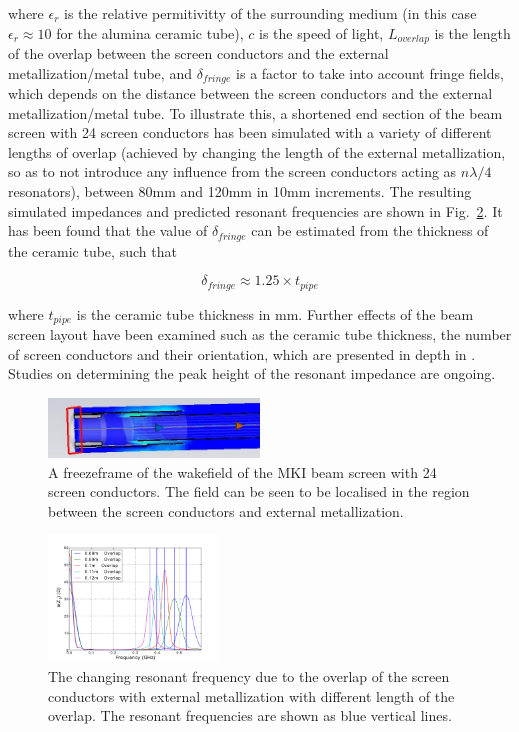 \documentclass{JAC2003}
\begin{document}
where $\epsilon_{r}$ is the relative permitivitty of the surrounding medium (in this case $\epsilon_{r} \approx 10$ for the alumina ceramic tube), $c$ is the speed of light, $L_{overlap}$ is the length of the overlap between the screen conductors and the external metallization/metal tube, and $\delta_{fringe}$ is a factor to take into account fringe fields, which depends on the distance between the screen conductors and the external metallization/metal tube. To illustrate this, a shortened end section of the beam screen with 24 screen conductors has been simulated with a variety of different lengths of overlap (achieved by changing the length of the external metallization, so as to not introduce any influence from the screen conductors acting as $n \lambda /4$ resonators), between 80mm and 120mm in 10mm increments. The resulting simulated impedances and predicted resonant frequencies are shown in Fig.~\ref{fig:mkiOverlapRes}. It has been found that the value of $\delta_{fringe}$ can be estimated from the thickness of the ceramic tube, such that

\begin{equation}
\delta_{fringe} \approx 1.25 \times t_{pipe}
\end{equation}

where $t_{pipe}$ is the ceramic tube thickness in mm. Further effects of the beam screen layout have been examined such as the ceramic tube thickness, the number of screen conductors and their orientation, which are presented in depth in \cite{DayThesis}. Studies on determining the peak height of the resonant impedance are ongoing.

\begin{figure}
\includegraphics[width=0.5\textwidth]{resField.jpeg}
\caption{A freezeframe of the wakefield of the MKI beam screen with 24 screen conductors. The field can be seen to be localised in the region between the screen conductors and external metallization.}
\label{fig:mkiResFieldPat}
\end{figure}

\begin{figure}
\begin{center}
\includegraphics[width=0.4\textwidth]{mki-overlap-len-real-imp-zoom.pdf}
\caption{The changing resonant frequency due to the overlap of the screen conductors with external metallization with different length of the overlap. The resonant frequencies are shown as blue vertical lines.}
\label{fig:mkiOverlapRes}
\end{center}
\end{figure}
\end{document}
